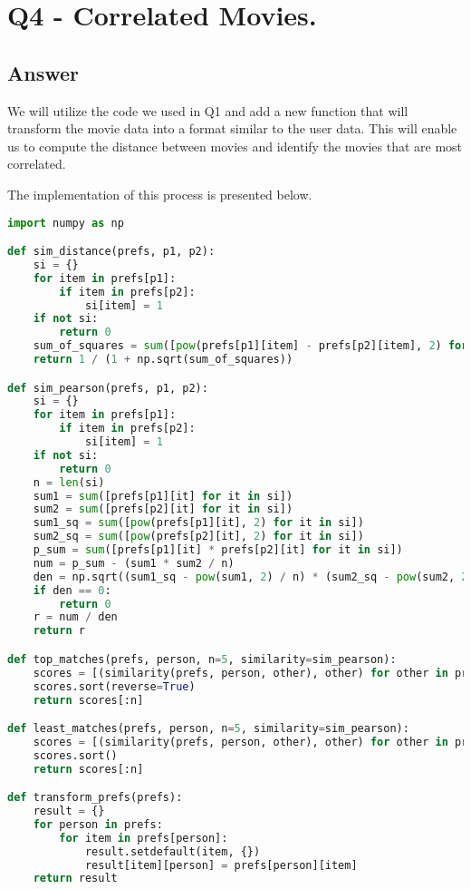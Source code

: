 \documentclass[12pt]{article}
\begin{document}
 
\clearpage

\section*{Q4 - Correlated Movies.}

\subsection*{Answer}
We will utilize the code we used in Q1 and add a new function that will transform the movie data into a format similar to the user data. This will enable us to compute the distance between movies and identify the movies that are most correlated.

The implementation of this process is presented below.
\begin{lstlisting}[language=Python, caption=Further tweet analysis] 
import numpy as np

def sim_distance(prefs, p1, p2):
    si = {}
    for item in prefs[p1]:
        if item in prefs[p2]:
            si[item] = 1
    if not si:
        return 0
    sum_of_squares = sum([pow(prefs[p1][item] - prefs[p2][item], 2) for item in si])
    return 1 / (1 + np.sqrt(sum_of_squares))

def sim_pearson(prefs, p1, p2):
    si = {}
    for item in prefs[p1]:
        if item in prefs[p2]:
            si[item] = 1
    if not si:
        return 0
    n = len(si)
    sum1 = sum([prefs[p1][it] for it in si])
    sum2 = sum([prefs[p2][it] for it in si])
    sum1_sq = sum([pow(prefs[p1][it], 2) for it in si])
    sum2_sq = sum([pow(prefs[p2][it], 2) for it in si])
    p_sum = sum([prefs[p1][it] * prefs[p2][it] for it in si])
    num = p_sum - (sum1 * sum2 / n)
    den = np.sqrt((sum1_sq - pow(sum1, 2) / n) * (sum2_sq - pow(sum2, 2) / n))
    if den == 0:
        return 0
    r = num / den
    return r

def top_matches(prefs, person, n=5, similarity=sim_pearson):
    scores = [(similarity(prefs, person, other), other) for other in prefs if other != person]
    scores.sort(reverse=True)
    return scores[:n]

def least_matches(prefs, person, n=5, similarity=sim_pearson):
    scores = [(similarity(prefs, person, other), other) for other in prefs if other != person]
    scores.sort()
    return scores[:n]

def transform_prefs(prefs):
    result = {}
    for person in prefs:
        for item in prefs[person]:
            result.setdefault(item, {})
            result[item][person] = prefs[person][item]
    return result


\end{lstlisting}
\end{document}
